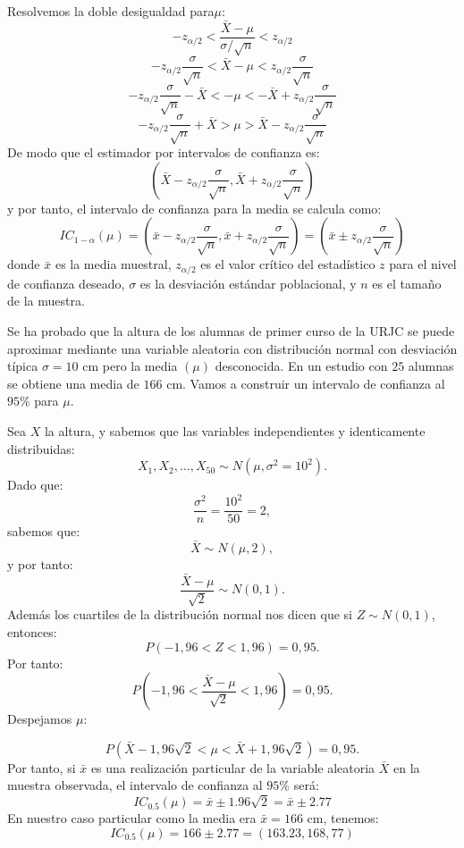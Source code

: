 \documentclass[
  letterpaper,
  DIV=11,
  numbers=noendperiod]{scrreprt}
\begin{document}
Resolvemos la doble desigualdad para\(\mu\): \[
-z_{\alpha/2}<\frac{\bar{X}-\mu}{\sigma/\sqrt{n}}<z_{\alpha/2} 
\] \[
-z_{\alpha/2}\frac{\sigma}{\sqrt{n}}<\bar{X}-\mu<z_{\alpha/2}\frac{\sigma}{\sqrt{n}} 
\]
\[ -z_{\alpha/2}\frac{\sigma}{\sqrt{n}}-\bar{X}<-\mu<-\bar{X}+z_{\alpha/2}\frac{\sigma}{\sqrt{n}} \]
\[ -z_{\alpha/2}\frac{\sigma}{\sqrt{n}}+\bar{X}>\mu>\bar{X}-z_{\alpha/2}\frac{\sigma}{\sqrt{n}}
\] De modo que el estimador por intervalos de confianza es: \[
\left ( \bar{X}-z_{\alpha/2}\frac{\sigma}{\sqrt{n}},\bar{X}+z_{\alpha/2}\frac{\sigma}{\sqrt{n}} \right)
\] y por tanto, el intervalo de confianza para la media se calcula como:
\[     
IC_{1-\alpha}(\mu)=\left (\bar{x} -z_{\alpha/2} \frac{\sigma}{\sqrt{n}},\bar{x} +z_{\alpha/2}  \frac{\sigma}{\sqrt{n}} \right )= \left( \bar{x} \pm z_{\alpha/2} \frac{\sigma}{\sqrt{n}} \right)
\] donde \(\bar{x}\) es la media muestral, \(z_{\alpha/2}\) es el valor
crítico del estadístico \(z\) para el nivel de confianza deseado,
\(\sigma\) es la desviación estándar poblacional, y \(n\) es el tamaño
de la muestra.

\begin{tcolorbox}[enhanced jigsaw, arc=.35mm, breakable, coltitle=black, left=2mm, opacityback=0, bottomtitle=1mm, colbacktitle=quarto-callout-tip-color!10!white, title=\textcolor{quarto-callout-tip-color}{\faLightbulb}\hspace{0.5em}{Ejemplo. Intervalo de confianza para la media de una distribución normal}, titlerule=0mm, colback=white, colframe=quarto-callout-tip-color-frame, bottomrule=.15mm, rightrule=.15mm, opacitybacktitle=0.6, toptitle=1mm, toprule=.15mm, leftrule=.75mm]

Se ha probado que la altura de los alumnas de primer curso de la URJC se
puede aproximar mediante una variable aleatoria con distribución normal
con desviación típica \(\sigma=10\) cm pero la media \((\mu)\)
desconocida. En un estudio con \(25\) alumnas se obtiene una media de
\(166\) cm. Vamos a construir un intervalo de confianza al \(95\%\) para
\(\mu\).

Sea \(X\) la altura, y sabemos que las variables independientes y
identicamente distribuidas: \[
X_1,X_2,\ldots,X_{50}\sim N(\mu,\sigma^2=10^2).
\] Dado que: \[
\frac{\sigma^2}{n}=\frac{10^2}{50}=2,
\] sabemos que: \[
\bar{X}\sim N(\mu,2),
\] y por tanto: \[
\frac{\bar{X}-\mu}{\sqrt{2}}\sim N(0,1).
\] Además los cuartiles de la distribución normal nos dicen que si
\(Z\sim N(0,1)\), entonces: \[
P(-1,96<Z<1,96)=0,95.
\] Por tanto: \[
P\left(-1,96<\frac{\bar{X}-\mu}{\sqrt{2}}<1,96\right)=0,95.
\] Despejamos \(\mu\):

\[
P\left(\bar{X}-1,96\sqrt{2}<\mu<\bar{X}+1,96\sqrt{2}\right)=0,95.
\] Por tanto, si \(\bar{x}\) es una realización particular de la
variable aleatoria \(\bar{X}\) en la muestra observada, el intervalo de
confianza al \(95\%\) será: \[
IC_{0.5}(\mu)=\bar{x}\pm1.96 \sqrt{2} = \bar{x}\pm2.77
\] En nuestro caso particular como la media era \(\bar{x}=166\) cm,
tenemos: \[
IC_{0.5}(\mu)= 166\pm2.77=(163.23 , 168,77)
\]

\end{tcolorbox}
\end{document}
